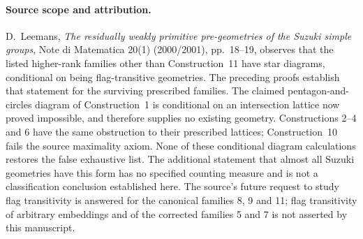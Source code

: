 \documentclass[11pt,a4paper]{article}
\begin{document}
\paragraph{Source scope and attribution.}
D.~Leemans, \emph{The residually weakly primitive pre-geometries of the
Suzuki simple groups}, Note di Matematica 20(1) (2000/2001), pp.~18--19,
observes that the listed higher-rank families other than Construction~11
have star diagrams, conditional on being flag-transitive geometries.
The preceding proofs establish that statement for the surviving
prescribed families. The claimed pentagon-and-circles diagram of
Construction~1 is conditional on an intersection lattice now proved
impossible, and therefore supplies no existing geometry. Constructions
2--4 and 6 have the same obstruction to their prescribed lattices;
Construction~10 fails the source maximality axiom. None of these
conditional diagram calculations restores the false exhaustive list.
The additional statement that almost all Suzuki geometries have this
form has no specified counting measure and is not a classification
conclusion established here. The source's future request to study flag
transitivity is answered for the canonical families 8, 9 and 11;
flag transitivity of arbitrary embeddings and of the corrected families
5 and 7 is not asserted by this manuscript.
\end{document}
